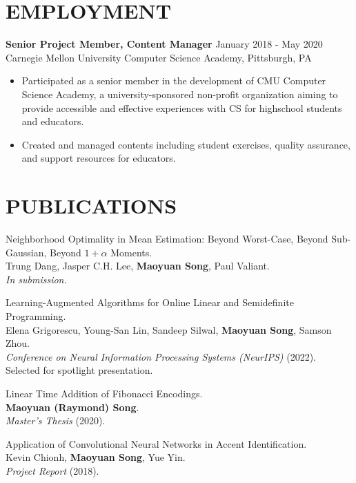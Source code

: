 \documentclass[margin, 10pt]{res} %
\begin{document}
\begin{resume}
\section{EMPLOYMENT}

{\bf Senior Project Member, Content Manager} \hfill January 2018 - May 2020 \\
Carnegie Mellon University Computer Science Academy, Pittsburgh, PA

\begin{itemize}
\item Participated as a senior member in the development of CMU Computer Science Academy, a university-sponsored non-profit organization aiming to provide accessible and effective experiences with CS for highschool students and educators.
\item Created and managed contents including student exercises, quality assurance, and support resources for educators.
\end{itemize} 


\section{PUBLICATIONS}
\begin{etaremune}
\item Neighborhood Optimality in Mean Estimation: Beyond Worst-Case, Beyond Sub-Gaussian, Beyond $1 + \alpha$ Moments.\\
Trung Dang, Jasper C.H. Lee, {\bf Maoyuan Song}, Paul Valiant.\\
\emph{In submission.}
\item Learning-Augmented Algorithms for Online Linear and Semidefinite Programming.\\
Elena Grigorescu, Young-San Lin, Sandeep Silwal, {\bf Maoyuan Song}, Samson Zhou.\\
\emph{Conference on Neural Information Processing Systems (NeurIPS)} (2022). Selected for spotlight presentation.
\item Linear Time Addition of Fibonacci Encodings.\\
{\bf Maoyuan (Raymond) Song}.\\
\emph{Master's Thesis} (2020). 
\item Application of Convolutional Neural Networks in Accent Identification.\\
Kevin Chionh, {\bf Maoyuan Song}, Yue Yin.\\
\emph{Project Report} (2018).
\end{etaremune}



\end{resume}
\end{document}
